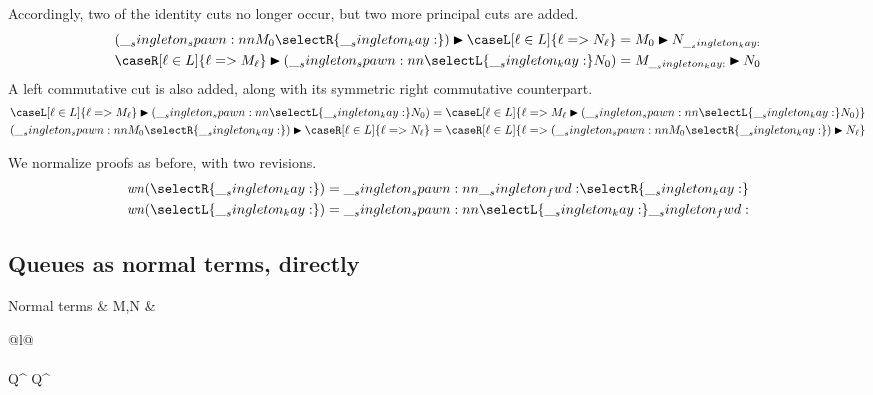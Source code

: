 Accordingly, two of the identity cuts no longer occur, but two more principal cuts are added.
\begin{equation*}
  \begin{lgathered}
    \nspawn{(\spawn{M_0}{\selectR{\kay}})}
           {\caseL[\ell \in L]{\ell => N_{\ell}}}
      = \nspawn{M_0}{N_{\kay}} \\
    \nspawn{\caseR[\ell \in L]{\ell => M_{\ell}}}
           {(\spawn{\selectL{\kay}}{N_0})}
      = \nspawn{M_{\kay}}{N_0}
  \end{lgathered}
\end{equation*}
A left commutative cut is also added, along with its symmetric right commutative counterpart.
\begin{equation*}
  \begin{lgathered}
  \nspawn{\caseL[\ell \in L]{\ell => M_{\ell}}}
         {(\spawn{\selectL{\kay}}{N_0})}
    = \caseL[\ell \in L]{\ell =>
        \nspawn{M_{\ell}}{(\spawn{\selectL{\kay}}{N_0})}} \\
  \nspawn{(\spawn{M_0}{\selectR{\kay}})}
         {\caseR[\ell \in L]{\ell => N_{\ell}}}
    = \caseR[\ell \in L]{\ell =>
        \nspawn{(\spawn{M_0}{\selectR{\kay}})}{N_{\ell}}}
  \end{lgathered}
\end{equation*}

We normalize proofs as before, with two revisions.
\begin{equation*}
  \begin{lgathered}
    \wnorm{\selectR{\kay}} = \spawn{\fwd}{\selectR{\kay}} \\
    \wnorm{\selectL{\kay}} = \spawn{\selectL{\kay}}{\fwd}
  \end{lgathered}
\end{equation*}

\subsection{Queues as normal terms, directly}

\begin{syntax*}
  Normal terms & M,N &
    \begin{array}[t]{@{}l@{}}
       \mid {} \\
      \mathllap{\mid {}}  \mid {} \\
      \mathllap{\mid {}} \fwd \mid Q^{\plus} \mid Q^{\with}
    \end{array}
\end{syntax*}

